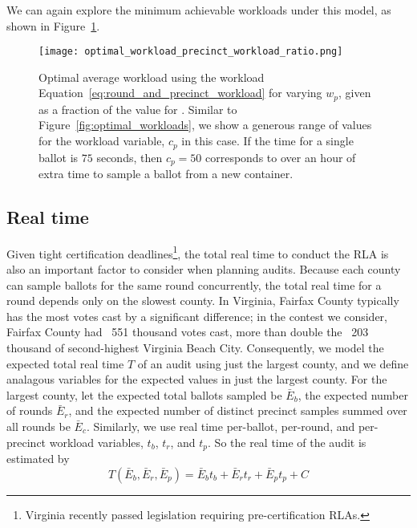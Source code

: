 We can again explore the minimum achievable workloads under this model, as shown in Figure~\ref{fig:optimal_workload_precinct_workload_ratio}.

\begin{figure}
\texttt{[image: optimal\_workload\_precinct\_workload\_ratio.png]}
\caption{Optimal average workload using the workload Equation~\ref{eq:round_and_precinct_workload} for varying $w_p$, given as a fraction of the value for \Providence. Similar to Figure~\ref{fig:optimal_workloads}, we show a generous range of values for the workload variable, $c_p$ in this case. If the time for a single ballot is $75$ seconds, then $c_p=50$ corresponds to over an hour of extra time to sample a ballot from a new container.}
\label{fig:optimal_workload_precinct_workload_ratio}
\end{figure}


\subsection{Real time}
Given tight certification deadlines\footnote{Virginia recently passed legislation requiring pre-certification RLAs.}, the total real time to conduct the RLA is also an important factor to consider when planning audits.
Because each county can sample ballots for the same round concurrently, the total real time for a round depends only on the slowest county. 
In Virginia, Fairfax County typically has the most votes cast by a significant difference; in the contest we consider, Fairfax County had ~551 thousand votes cast, more than double the ~203 thousand of second-highest Virginia Beach City.
Consequently, we model the expected total real time $T$ of an audit using just the largest county, and we define analagous variables for the expected values in just the largest county.
For the largest county, let the expected total ballots sampled be $\bar E_b$, the expected number of rounds $\bar E_r$, and the expected number of distinct precinct samples summed over all rounds be $\bar E_c$.
Similarly, we use real time per-ballot, per-round, and per-precinct workload variables, $t_b$, $t_r$, and $t_p$. So the real time of the audit is estimated by
\begin{equation}
T(\bar E_b, \bar E_r, \bar E_p ) = \bar E_b t_b + \bar E_r t_r + \bar E_p t_p + C
\label{eq:real_time}
\end{equation}


